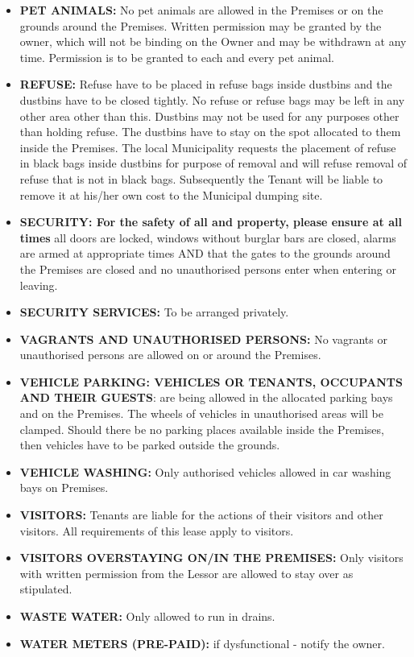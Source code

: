 \documentclass[11pt]{article}
\begin{document}
\begin{itemize}
	\item \textbf{\uppercase{pet animals:}} No pet animals are allowed in the Premises or on the grounds around the Premises. Written permission may be granted by the owner, which will not be binding on the Owner and may be withdrawn at any time. Permission is to be granted to each and every pet animal.
	\item \textbf{\uppercase{refuse:}} Refuse have to be placed in refuse bags inside dustbins and the dustbins have to be closed tightly. No refuse or refuse bags may be left in any other area other than this. Dustbins may not be used for any purposes other than holding refuse. The dustbins have to stay on the spot allocated to them inside the Premises.
		The local Municipality requests the placement of refuse in black bags inside dustbins for purpose of removal and will refuse removal of refuse that is not in black bags. Subsequently the Tenant will be liable to remove it at his/her own cost to the Municipal dumping site.
	\item \textbf{\uppercase{security}: For the safety of all and property, please ensure at all times} all doors are locked, windows without burglar bars are closed, alarms are armed at appropriate times AND that the gates to the grounds around the Premises are closed and no unauthorised persons enter when entering or leaving.
	\item \textbf{\uppercase{security services:}} To be arranged privately.
	\item \textbf{\uppercase{vagrants and unauthorised persons:}} No vagrants or unauthorised persons are allowed on or around the Premises.
	\item \textbf{\uppercase{vehicle parking: vehicles or tenants, occupants and their guests}}: are being allowed in the allocated parking bays and on the Premises. The wheels of vehicles in unauthorised areas will be clamped. Should there be no parking places available inside the Premises, then vehicles have to be parked outside the grounds.
	\item \textbf{\uppercase{vehicle washing:}} Only authorised vehicles allowed in car washing bays on Premises.
	\item \textbf{\uppercase{visitors:}} Tenants are liable for the actions of their visitors and other visitors. All requirements of this lease apply to visitors.
	\item \textbf{\uppercase{visitors overstaying on/in the premises:}} Only visitors with written permission from the Lessor are allowed to stay over as stipulated.
	\item \textbf{\uppercase{waste water:}} Only allowed to run in drains.
	\item \textbf{\uppercase{water meters (pre-paid):}} if dysfunctional - notify the owner.
\end{itemize}
\end{document}
